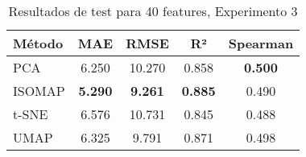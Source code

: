 \begin{table}[h]
\centering
\begin{tabular}{lcccc}
\toprule
\textbf{Método} & \textbf{MAE} & \textbf{RMSE} & \textbf{R²} & \textbf{Spearman} \\
\midrule
PCA & 6.250 & 10.270 & 0.858 & \textbf{0.500} \\
ISOMAP & \textbf{5.290} & \textbf{9.261} & \textbf{0.885} & 0.490 \\
t-SNE & 6.576 & 10.731 & 0.845 & 0.488 \\
UMAP & 6.325 & 9.791 & 0.871 & 0.498 \\
\bottomrule
\end{tabular}
\caption{Resultados de test para 40 features, Experimento 3}
\label{tab:test_results_40feat_exp3}
\end{table}